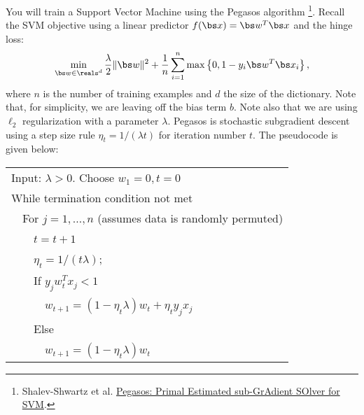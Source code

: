 \documentclass{article}
\theoremstyle{plain}
\theoremstyle{definition}
\begin{document}
You will train a Support Vector Machine using the Pegasos algorithm
\footnote{Shalev-Shwartz et al. \href{http://ttic.uchicago.edu/~nati/Publications/PegasosMPB.pdf}{Pegasos: Primal Estimated sub-GrAdient SOlver for SVM}.}.
Recall the SVM objective using a linear predictor $f(\bs x) = \bs w ^T \bs x$ and the hinge loss:
\[
\min_{\bs w\in\reals^{d}}\frac{\lambda}{2}\|\bs w\|^{2}+\frac{1}{n}\sum_{i=1}^{n}\max\left\{ 0,1-y_{i}\bs w^{T}\bs x_{i}\right\} ,
\]
where $n$ is the number of training examples and $d$ the size of the dictionary.
Note that, for simplicity, we are leaving off the 
bias
term $b$. Note also that we are using $\ell_2$ regularization with a parameter $\lambda$. Pegasos is stochastic subgradient descent using a step
size rule $\eta_{t}=1/\left(\lambda t\right)$ for iteration number $t$. The pseudocode is
given below:
\begin{center}
\begin{tabular}{l}
\hline 
Input: $\lambda>0$. Choose $w_{1}=0,t=0$\tabularnewline
While termination condition not met\tabularnewline
\ \ For $j=1,\ldots,n$ (assumes data is randomly permuted)\tabularnewline
\ \ \ \ $t=t+1$\tabularnewline
\ \ \ \ $\eta_{t}=1/\left(t\lambda\right)$;\tabularnewline
\ \ \ \ If $y_{j}w_{t}^{T}x_{j}<1$\tabularnewline
\ \ \ \ \ \ $w_{t+1}=(1-\eta_{t}\lambda)w_{t}+\eta_{t}y_{j}x_{j}$\tabularnewline
\ \ \ \ Else \tabularnewline
\ \ \ \ \ \ $w_{t+1}=(1-\eta_{t}\lambda)w_{t}$\tabularnewline
\hline 
\end{tabular}
\par\end{center}
\end{document}
